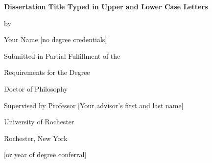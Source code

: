 

\begin{titlepage}
  \vspace*{\fill}

  \begin{center}
    {\LARGE \bfseries Dissertation Title Typed in Upper and Lower Case
      Letters \par
    }

    \bigskip%
    by

    \bigskip%
    Your Name [no degree credentials]


    \bigskip\bigskip\bigskip\bigskip%
    Submitted in Partial Fulfillment of the

    \bigskip%
    Requirements for the Degree

    \bigskip%
    Doctor of Philosophy


    \bigskip\bigskip\bigskip\bigskip%
    Supervised by Professor [Your advisor's first and last name]

    \bigskip{}




    \bigskip\bigskip\bigskip\bigskip%
    University of Rochester

    \bigskip%
    Rochester, New York


    \bigskip\bigskip\bigskip{} [or year of degree conferral]
  \end{center}

  \vspace*{\fill}
\end{titlepage}

